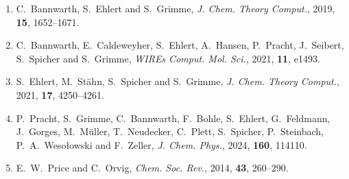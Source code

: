 \documentclass[11pt,a4paper]{article}
\begin{document}
\begin{enumerate}\setlength{\itemsep}{2pt}
\item C.~Bannwarth, S.~Ehlert and S.~Grimme, \textit{J. Chem. Theory Comput.}, 2019, \textbf{15}, 1652--1671.
\item C.~Bannwarth, E.~Caldeweyher, S.~Ehlert, A.~Hansen, P.~Pracht, J.~Seibert, S.~Spicher and S.~Grimme, \textit{WIREs Comput. Mol. Sci.}, 2021, \textbf{11}, e1493.
\item S.~Ehlert, M.~St{\"a}hn, S.~Spicher and S.~Grimme, \textit{J. Chem. Theory Comput.}, 2021, \textbf{17}, 4250--4261.
\item P.~Pracht, S.~Grimme, C.~Bannwarth, F.~Bohle, S.~Ehlert, G.~Feldmann, J.~Gorges, M.~M{\"u}ller, T.~Neudecker, C.~Plett, S.~Spicher, P.~Steinbach, P.~A.~Wesołowski and F.~Zeller, \textit{J. Chem. Phys.}, 2024, \textbf{160}, 114110.
\item E.~W.~Price and C.~Orvig, \textit{Chem. Soc. Rev.}, 2014, \textbf{43}, 260--290.
\end{enumerate}
\end{document}
